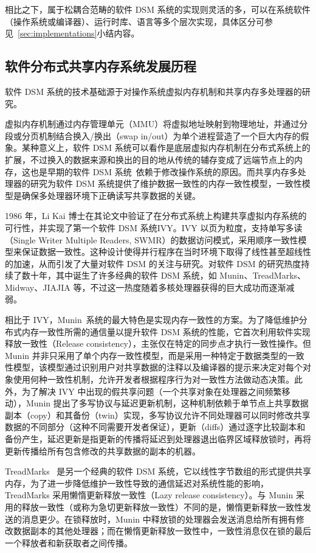 {相比之下，属于松耦合范畴的软件 DSM 系统的实现则灵活的多，可以在系统软件（操作系统或编译器）、运行时库、语言等多个层次实现，具体区分可参见~\ref{sec:implementations}小结内容。
\subsection{软件分布式共享内存系统发展历程}
软件 DSM 系统的技术基础源于对操作系统虚拟内存机制和共享内存多处理器的研究。

虚拟内存机制通过内存管理单元（MMU）将虚拟地址映射到物理地址，并通过分段或分页机制结合换入/换出（swap in/out）为单个进程营造了一个巨大内存的假象。某种意义上，软件 DSM 系统可以看作是底层虚拟内存机制在分布式系统上的扩展，不过换入的数据来源和换出的目的地从传统的辅存变成了远端节点上的内存，这也是早期的软件 DSM 系统~\citep{likai1988ivy,bennett1990munin}依赖于修改操作系统的原因。而共享内存多处理器的研究为软件 DSM 系统提供了维护数据一致性的内存一致性模型，一致性模型是确保多处理器环境下正确读写共享数据的关键。

1986 年，Li Kai 博士在其论文\citep{likai1986svm}中验证了在分布式系统上构建共享虚拟内存系统的可行性，并实现了第一个软件 DSM 系统IVY\citep{likai1988ivy}。IVY 以页为粒度，支持单写多读（Single Writer Multiple Readers, SWMR）的数据访问模式，采用顺序一致性模型来保证数据一致性。这种设计使得并行程序在当时环境下取得了线性甚至超线性的加速，从而引发了大量对软件 DSM 的关注与研究。对软件 DSM 的研究热度持续了数十年，其中诞生了许多经典的软件 DSM 系统，如 Munin、TreadMarks、Midway、JIAJIA 等，不过这一热度随着多核处理器获得的巨大成功而逐渐减弱。

相比于 IVY，Munin~\citep{bennett1990munin}系统的最大特色是实现内存一致性的方案。为了降低维护分布式内存一致性所需的通信量以提升软件 DSM 系统的性能，它首次利用软件实现释放一致性（Release consistency），主张仅在特定的同步点才执行一致性操作。但 Munin 并非只采用了单个内存一致性模型，而是采用一种特定于数据类型的一致性模型，该模型通过识别用户对共享数据的注释以及编译器的提示来决定对每个对象使用何种一致性机制，允许开发者根据程序行为对一致性方法做动态决策。此外，为了解决 IVY 中出现的假共享问题（一个共享对象在处理器之间频繁移动），Munin 提出了多写协议与延迟更新机制，这种机制依赖于单节点上共享数据副本（copy）和其备份（twin）实现，多写协议允许不同处理器可以同时修改共享数据的不同部分（这种不同需要开发者保证），更新（diffs）通过逐字比较副本和备份产生，延迟更新是指更新的传播将延迟到处理器退出临界区域释放锁时，再将更新传播给所有包含修改的共享数据的副本的机器。

TreadMarks~\citep{amza1996treadmarks} 是另一个经典的软件 DSM 系统，它以线性字节数组的形式提供共享内存，为了进一步降低维护一致性导致的通信延迟对系统性能的影响，TreadMarks 采用懒惰更新释放一致性（Lazy release consistency）。与 Munin 采用的释放一致性（或称为急切更新释放一致性）不同的是，懒惰更新释放一致性发送的消息更少。在锁释放时，Munin 中释放锁的处理器会发送消息给所有拥有修改数据副本的其他处理器；而在懒惰更新释放一致性中，一致性消息仅在锁的最后一个释放者和新获取者之间传播。

}
